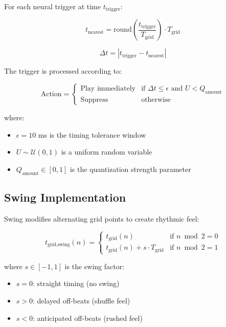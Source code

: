 \documentclass[11pt,a4paper]{article}
\begin{document}
For each neural trigger at time $t_{\text{trigger}}$:

\begin{equation}
t_{\text{nearest}} = \text{round}\left(\frac{t_{\text{trigger}}}{T_{\text{grid}}}\right) \cdot T_{\text{grid}}
\end{equation}

\begin{equation}
\Delta t = |t_{\text{trigger}} - t_{\text{nearest}}|
\end{equation}

The trigger is processed according to:

\begin{equation}
\text{Action} = \begin{cases}
\text{Play immediately} & \text{if } \Delta t \leq \epsilon \text{ and } U < Q_{\text{amount}} \\
\text{Suppress} & \text{otherwise}
\end{cases}
\end{equation}

\noindent where:
\begin{itemize}
\item $\epsilon = 10$ ms is the timing tolerance window
\item $U \sim \mathcal{U}(0,1)$ is a uniform random variable
\item $Q_{\text{amount}} \in [0,1]$ is the quantization strength parameter
\end{itemize}

\subsection{Swing Implementation}

Swing modifies alternating grid points to create rhythmic feel:

\begin{equation}
t_{\text{grid,swing}}(n) = \begin{cases}
t_{\text{grid}}(n) & \text{if } n \bmod 2 = 0 \\
t_{\text{grid}}(n) + s \cdot T_{\text{grid}} & \text{if } n \bmod 2 = 1
\end{cases}
\end{equation}

\noindent where $s \in [-1, 1]$ is the swing factor:
\begin{itemize}
\item $s = 0$: straight timing (no swing)
\item $s > 0$: delayed off-beats (shuffle feel)
\item $s < 0$: anticipated off-beats (rushed feel)
\end{itemize}
\end{document}
